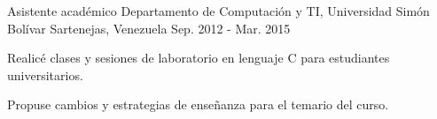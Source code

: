 \begin{cventries}
  \cventry
    {Asistente académico}
    {Departamento de Computación y TI, Universidad Simón Bolívar}
    {Sartenejas, Venezuela}
    {Sep. 2012 - Mar. 2015}
    {
      \begin{cvitems}
        \item {Realicé clases y sesiones de laboratorio en lenguaje C para estudiantes universitarios.}
        \item {Propuse cambios y estrategias de enseñanza para el temario del curso.}
      \end{cvitems}
    }
\end{cventries}
